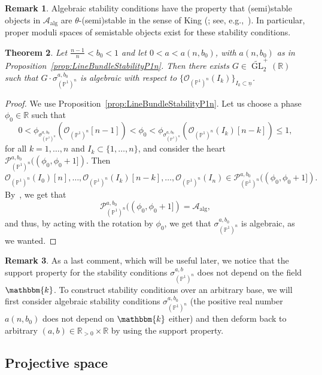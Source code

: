 \documentclass[11pt, reqno]{amsart}
\numberwithin{equation}{section}
\theoremstyle{plain}
\newtheorem{theorem}{Theorem}[section]
\theoremstyle{remark}
\theoremstyle{definition}
\newtheorem{remark}[theorem]{Remark}
\theoremstyle{italicsname}
\DeclareMathOperator{\GL}{GL}
\newcommand{\cO}{\mathcal{O}}
\newcommand{\cA}{\mathscr{A}}
\newcommand{\cP}{\mathscr{P}}
\newcommand{\KK}{\mathbbm{k}}
\def\RR{\ensuremath{\mathbb{R}}}
\def\PP{\ensuremath{\mathbb{P}}}
\begin{document}
\begin{remark}\label{rmk:AlgebraicSatbilityMod}
Algebraic stability conditions have the property that (semi)stable objects in $\cA_\mathrm{alg}$ are $\theta$-(semi)stable in the sense of King (\cite{King}; see, e.g.,~\cite[Remark 3.6]{macricurves}).
In particular, proper moduli spaces of semistable objects exist for these stability conditions.
\end{remark}

\begin{theorem}\label{thm:AlgebraicP1n}
Let $\frac{n-1}{n}<b_0<1$ and let $0<a<a(n,b_0)$, with $a(n,b_0)$ as in Proposition~\ref{prop:LineBundleStabilityP1n}.
Then there exists $G\in\widetilde{\GL}_2^+(\RR)$ such that $G\cdot\sigma^{a,b_0}_{(\PP^1)^n}$ is algebraic with respect to $\{\cO_{(\PP^1)^n}(I_{k})\}_{I_k\subset\underline{n}}$.
\end{theorem}

\begin{proof}
We use Proposition~\ref{prop:LineBundleStabilityP1n}.
Let us choose a phase $\phi_0\in\RR$ such that
\[
0<\phi_{\sigma_{(\PP^1)^n}^{a,b_0}}(\cO_{(\PP^1)^n}[n-1])<\phi_0<\phi_{\sigma_{(\PP^1)^n}^{a,b_0}}(\cO_{(\PP^1)^n}(I_{k})[n-k])\leq 1,
\]
for all $k=1,\dots,n$ and $I_{k}\subset\{1,\dots,n\}$, and consider the heart $\cP^{a,b_0}_{(\PP^1)^n}((\phi_0,\phi_0+1])$.
Then
\[
\cO_{(\PP^1)^n}(I_{0})[n],\dots,\cO_{(\PP^1)^n}(I_{k})[n-k],\dots,\cO_{(\PP^1)^n}(I_{n})\in\cP^{a,b_0}_{(\PP^1)^n}((\phi_0,\phi_0+1]).
\]
By~\cite[Lemma 2.3]{macricurves}, we get that 
\[
\cP^{a,b_0}_{(\PP^1)^n}((\phi_0,\phi_0+1])=\cA_\mathrm{alg},
\]
and thus, by acting with the rotation by $\phi_0$, we get that $\sigma_{(\PP^1)^n}^{a,b_0}$ is algebraic, as we wanted.
\end{proof}

\begin{remark}\label{rmK:SupportField}
As a last comment, which will be useful later, we notice that the support property for the stability conditions $\sigma_{(\PP^1)^n}^{a,b}$ does not depend on the field $\KK$.
To construct stability conditions over an arbitrary base, we will first consider algebraic stability conditions $\sigma_{(\PP^1)^n}^{a,b_0}$ (the positive real number $a(n,b_0)$ does not depend on $\KK$ either) and then deform back to arbitrary $(a,b)\in\RR_{>0}\times\RR$ by using the support property.
\end{remark}

\subsection{Projective space}\label{subsec:Pn}
\end{document}
